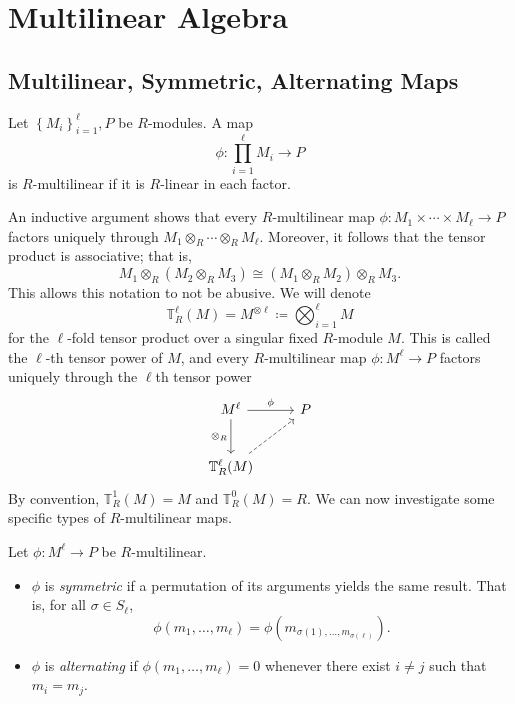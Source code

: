\section{Multilinear Algebra}
\subsection{Multilinear, Symmetric, Alternating Maps}
\begin{definition}[Multilinear]\label{dfn:8.13}
	Let $\left\{ M_i \right\}_{i=1}^\ell ,P $ be $R$-modules. A map
	\[
		\phi : \prod_{i=1}^{\ell }  M_i \to P
	\]
	is $R$-multilinear if it is $R$-linear in each factor.
\end{definition}

An inductive argument shows that every $R$-multilinear map $\phi : M_1 \times \cdots \times M_{\ell }  \to P$ factors uniquely through $M_1 \otimes_R \cdots \otimes_{R} M_{\ell } $. Moreover, it follows that the tensor product is associative; that is,
\[
	M_1 \otimes _R(M_2\otimes _RM_3)\cong (M_1\otimes _RM_2)\otimes _RM_3
.\]
This allows this notation to not be abusive. We will denote
\[
	\mathbb{T} _R^{\ell }\left(M \right)  =M^{\otimes \ell }\coloneqq \bigotimes_{i=1}^\ell M
\]
for the $\ell $-fold tensor product over a singular fixed $R$-module $M$. This is called the $\ell $-th tensor power of $M$, and every $R$-multilinear map $\phi : M^{\ell }  \to P$ factors uniquely through the $\ell $th tensor power
\[\begin{tikzcd}[row sep = 2.5em, column sep = 2.5em]
	M^{\ell } \arrow[r, "\phi "]\arrow[d, "\otimes_R"']&P\\
	\mathbb{T}_R^{\ell } (M)\arrow[ur, dashed]
\end{tikzcd}\]
By convention, $\mathbb{T} _R^1(M)=M$ and $\mathbb{T} _R^0(M)=R$. We can now investigate some specific types of $R$-multilinear maps.
\begin{definition}\label{dfn:8.14}
	Let $\phi : M^{\ell }  \to P$ be $R$-multilinear.
	\begin{itemize}
		\item $\phi $ is \emph{symmetric} if a permutation of its arguments yields the same result. That is, for all $\sigma \in S_{\ell } $,
			\[
				\phi \left( m_1, \ldots, m_\ell   \right) =\phi (m_{\sigma (1), \ldots , m_{\sigma (\ell )} } )
			.\]
		\item $\phi $ is \emph{alternating} if $\phi (m_1, \ldots, m_\ell  )=0$ whenever there exist $i\neq j$ such that $m_i=m_j$.
	\end{itemize}
\end{definition}
